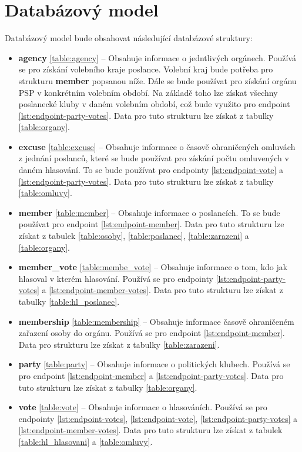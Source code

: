 \section{Databázový model}
\label{sec:database_model}

Databázový model bude obsahovat následující databázové struktury:

\begin{itemize}
	\item \textbf{agency} \ref{table:agency} -- Obsahuje informace o jedntlivých orgánech. Používá se pro získání volebního kraje poslance. Volební kraj bude potřeba pro strukturu \textbf{member} popsanou níže. Dále se bude používat pro získání orgánu PSP v konkrétním volebním období. Na základě toho lze získat všechny poslanecké kluby v daném volebním období, což bude využito pro endpoint \ref{lst:endpoint-party-votes}. Data pro tuto strukturu lze získat z tabulky \ref{table:organy}.
	

	\item \textbf{excuse} \ref{table:excuse} -- Obsahuje informace o časově ohraničených omluvách z jednání poslanců, které se bude používat pro získání počtu omluvených v daném hlasování. To se bude používat pro endpointy \ref{lst:endpoint-vote} a \ref{lst:endpoint-party-votes}. Data pro tuto strukturu lze získat z tabulky \ref{table:omluvy}.
	
	\item \textbf{member} \ref{table:member} -- Obsahuje informace o poslancích. To se bude používat pro endpoint \ref{lst:endpoint-member}. Data pro tuto strukturu lze získat z tabulek \ref{table:osoby}, \ref{table:poslanec}, \ref{table:zarazeni} a \ref{table:organy}.
	
	\item \textbf{member\_vote} \ref{table:membe_vote} -- Obsahuje informace o tom, kdo jak hlasoval v kterém hlasování. Používá  se pro endpointy \ref{lst:endpoint-party-votes} a \ref{lst:endpoint-member-votes}. Data pro tuto strukturu lze získat z tabulky \ref{table:hl_poslanec}.
	
	\item \textbf{membership} \ref{table:membership} -- Obsahuje informace časově ohraničeném zařazení osoby do orgánu. Používá se pro endpoint \ref{lst:endpoint-member}. Data pro strukturu lze získat z tabulky \ref{table:zarazeni}.
	
	\item \textbf{party} \ref{table:party} -- Obsahuje informace o politických klubech. Používá se pro endpoint \ref{lst:endpoint-member} a \ref{lst:endpoint-party-votes}. Data pro tuto strukturu lze získat z tabulky \ref{table:organy}.
	
	\item \textbf{vote} \ref{table:vote} -- Obsahuje informace o hlasováních. Používá se pro endpointy \ref{lst:endpoint-votes}, \ref{lst:endpoint-vote}, \ref{lst:endpoint-party-votes} a \ref{lst:endpoint-member-votes}. Data pro tuto strukturu lze získat z tabulek \ref{table:hl_hlasovani} a \ref{table:omluvy}.

\end{itemize}
